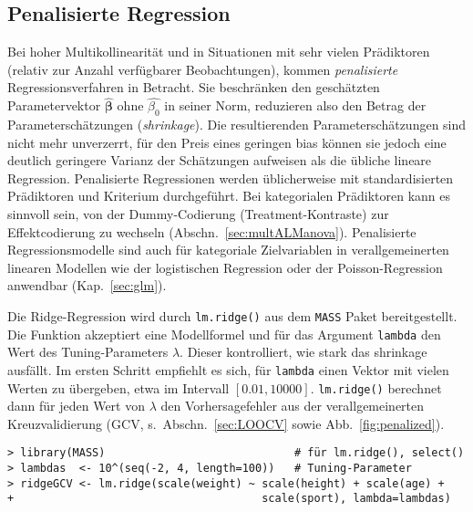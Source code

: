 \subsection{Penalisierte Regression}
\label{sec:lmPen}

Bei hoher Multikollinearität und in Situationen mit sehr vielen Prädiktoren (relativ zur Anzahl verfügbarer Beobachtungen), kommen \emph{penalisierte} Regressionsverfahren in Betracht. Sie beschränken den geschätzten Parametervektor $\hat{\bm{\beta}}$ ohne $\hat{\beta_{0}}$ in seiner Norm, reduzieren also den Betrag der Parameterschätzungen (\emph{shrinkage}). Die resultierenden Parameterschätzungen sind nicht mehr unverzerrt, für den Preis eines geringen bias können sie jedoch eine deutlich geringere Varianz der Schätzungen aufweisen als die übliche lineare Regression. Penalisierte Regressionen werden üblicherweise mit standardisierten Prädiktoren und Kriterium durchgeführt. Bei kategorialen Prädiktoren kann es sinnvoll sein, von der Dummy-Codierung (Treatment-Kontraste) zur Effektcodierung zu wechseln (Abschn.\ \ref{sec:multALManova}). Penalisierte Regressionsmodelle sind auch für kategoriale Zielvariablen in verallgemeinerten linearen Modellen wie der logistischen Regression oder der Poisson-Regression anwendbar (Kap.\ \ref{sec:glm}).

Die Ridge-Regression wird durch \lstinline!lm.ridge()! aus dem \lstinline!MASS! Paket \cite{Venables2002} bereitgestellt. Die Funktion akzeptiert eine Modellformel und für das Argument \lstinline!lambda! den Wert des Tuning-Parameters $\lambda$. Dieser kontrolliert, wie stark das shrinkage ausfällt. Im ersten Schritt empfiehlt es sich, für \lstinline!lambda! einen Vektor mit vielen Werten zu übergeben, etwa im Intervall $[0.01, 10000]$. \lstinline!lm.ridge()! berechnet dann für jeden Wert von $\lambda$ den Vorhersagefehler aus der verallgemeinerten Kreuzvalidierung (GCV, s.\ Abschn.\ \ref{sec:LOOCV} sowie Abb.\ \ref{fig:penalized}).
\begin{lstlisting}
> library(MASS)                             # für lm.ridge(), select()
> lambdas  <- 10^(seq(-2, 4, length=100))   # Tuning-Parameter
> ridgeGCV <- lm.ridge(scale(weight) ~ scale(height) + scale(age) +
+                                      scale(sport), lambda=lambdas)
\end{lstlisting}

